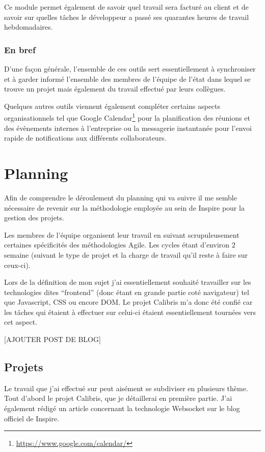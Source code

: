 \documentclass[12pt,a4paper]{book}
\begin{document}
Ce module permet également de savoir quel travail sera facturé au client et de savoir sur quelles tâches le développeur a passé ses quarantes heures de travail hebdomadaires.

\subsection{En bref} 

D'une façon générale, l'ensemble de ces outils sert essentiellement à synchroniser et à garder informé l'ensemble des membres de l'équipe de l'état dans lequel se trouve un projet mais également du travail effectué par leurs collègues.

Quelques autres outils viennent également compléter certains aspects organisationnels tel que Google Calendar\footnote{\url{https://www.google.com/calendar/}} pour la planification des réunions et des évènements internes à l'entreprise ou la messagerie instantanée pour l'envoi rapide de notifications aux différents collaborateurs.

\chapter{Planning}

Afin de comprendre le déroulement du planning qui va suivre il me semble nécessaire de revenir sur la méthodologie employée au sein de Inspire pour la gestion des projets.

Les membres de l'équipe organisent leur travail en suivant scrupuleusement certaines spécificités des méthodologies Agile. Les cycles étant d'environ 2 semaine (suivant le type de projet et la charge de travail qu'il reste à faire sur ceux-ci).

Lors de la définition de mon sujet j'ai essentiellement souhaité travailler sur les technologies dites ``frontend'' (donc étant en grande partie coté navigateur) tel que Javascript, CSS ou encore DOM. Le projet Calibris m'a donc été confié car les tâches qui étaient à effectuer sur celui-ci étaient essentiellement tournées vers cet aspect.

[AJOUTER POST DE BLOG]

\section{Projets}

Le travail que j'ai effectué sur peut aisément se subdiviser en plusieurs thème. Tout d'abord le projet Calibris, que je détaillerai en première partie. J'ai également rédigé un article concernant la technologie Websocket sur le blog officiel de Inspire.
\end{document}
